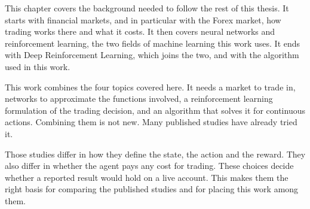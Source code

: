 \label{Chapter:Background}

This chapter covers the background needed to follow the rest of this thesis. It starts with financial markets, and in particular with the Forex market, how trading works there and what it costs. It then covers neural networks and reinforcement learning, the two fields of machine learning this work uses. It ends with Deep Reinforcement Learning, which joins the two, and with the algorithm used in this work.









This work combines the four topics covered here. It needs a market to trade in, networks to approximate the functions involved, a reinforcement learning formulation of the trading decision, and an algorithm that solves it for continuous actions. Combining them is not new. Many published studies have already tried it.

Those studies differ in how they define the state, the action and the reward. They also differ in whether the agent pays any cost for trading. These choices decide whether a reported result would hold on a live account. This makes them the right basis for comparing the published studies and for placing this work among them.